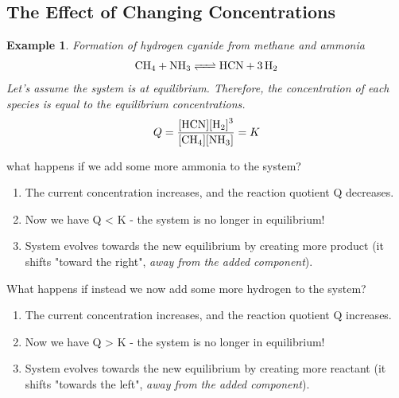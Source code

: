 \documentclass{article}  %
\newtheorem{exmp}{Example}
\begin{document}
\subsection*{The Effect of Changing Concentrations}
\begin{exmp}
    Formation of hydrogen cyanide from methane and ammonia 
    \begin{equation*}
        \begin{aligned}
            \ce{CH4 + NH3 <=> HCN + 3 H2}
        \end{aligned}
    \end{equation*}
    Let's assume the system is at equilibrium. Therefore, the concentration of each species is equal to the equilibrium concentrations.
    \begin{equation*}
        \begin{aligned}
            Q = \ce{\frac{[HCN][H2]^3}{[CH4][NH3]}} = K
        \end{aligned}
    \end{equation*}
\end{exmp}
what happens if we add some more ammonia to the system?
\begin{enumerate}
    \item The current  concentration increases, and the reaction quotient Q decreases.
    \item Now we have Q < K - the system is no longer in equilibrium!
    \item System evolves towards the new equilibrium by creating more product (it shifts "toward the right", \emph{away from the added component}).
\end{enumerate}
What happens if instead we now add some more hydrogen to the system?
\begin{enumerate}
    \item The current  concentration increases, and the reaction quotient Q increases.
    \item Now we have Q > K - the system is no longer in equilibrium!
    \item System evolves towards the new equilibrium by creating more reactant (it shifts "towards the left", \emph{away from the added component}).
\end{enumerate}
\end{document}
